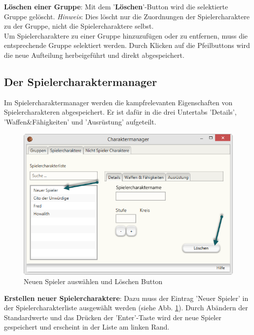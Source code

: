 \documentclass[11pt, a4paper, german]{article}
\begin{document}
\textbf{Löschen einer Gruppe}: Mit dem '\textbf{Löschen}'-Button wird die selektierte Gruppe gelöscht. \textit{Hinweis}: Dies löscht nur die Zuordnungen der Spielercharaktere zu der Gruppe, nicht die Spielercharaktere selbst.\\

Um Spielercharaktere zu einer Gruppe hinzuzufügen oder zu entfernen, muss die entsprechende Gruppe selektiert werden. Durch Klicken auf die Pfeilbuttons wird die neue Aufteilung herbeigeführt und direkt abgespeichert.

\subsection{Der Spielercharaktermanager}\label{subsection:Spielercharaktermanager}
Im Spielercharaktermanager werden die kampfrelevanten Eigenschaften von Spielercharakteren abgespeichert. 
Er ist dafür in die drei Untertabs 'Details', 'Waffen\&Fähigkeiten' und 'Ausrüstung' aufgeteilt.\\
\begin{figure}[h!]
\centering
\includegraphics[width=1\linewidth]{Bilder/Charaktermanager1}
\caption{Neuen Spieler auswählen und Löschen Button}
\label{fig:Charaktermanager1}
\end{figure}

\textbf{Erstellen neuer Spielercharaktere}: Dazu muss der Eintrag 'Neuer Spieler' in der Spielercharakterliste ausgewählt werden (siehe Abb. \ref{fig:Charaktermanager1}). Durch Abändern der Standardwerte und das Drücken der 'Enter'-Taste wird der neue Spieler gespeichert und erscheint in der Liste am linken Rand.\\
\end{document}
